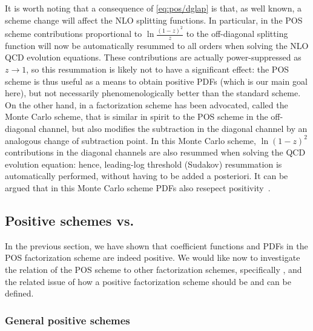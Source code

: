 It is worth noting that a consequence of \cref{eq:pos/dglap} is that,
as well known, a scheme change will affect the NLO splitting
functions. In particular, in the POS scheme contributions proportional
to $\ln\frac{(1-z)^2}{z}$ to the off-diagonal splitting function will
now be automatically resummed to all orders when solving the NLO QCD
evolution equations. These contributions are actually power-suppressed
as $z\to1$, so this resummation is likely not to have a significant
effect: the POS scheme is thus useful as a means to obtain positive
PDFs (which is our main goal here), but not necessarily
phenomenologically better than the standard \msbar{} scheme. On the
other hand, in \cite{Jadach:2016acv} a factorization scheme has
been advocated, called the Monte Carlo scheme, that is similar in
spirit to the POS scheme in the off-diagonal channel, but also
modifies the \msbar{} subtraction in the diagonal channel by an
analogous change of subtraction point. In this Monte Carlo scheme,
$\ln(1-z)^2$ contributions in the diagonal channels are also resummed
when solving the QCD evolution equation: hence, leading-log threshold (Sudakov)
resummation is automatically performed, without having to be added a
posteriori. It can be argued that in this Monte Carlo scheme PDFs also
resepect positivity~\cite{jadprivate}.



\subsection{Positive schemes vs.\ \msbar{}}
\label{sec:gen}

In the previous section, we have shown that coefficient functions and
PDFs in the POS
factorization scheme are indeed positive. We would like now to
investigate the relation of the POS scheme to other factorization
schemes, specifically \msbar{}, and the related issue 
of
how a positive factorization scheme should be and can be defined.

\subsubsection{General positive schemes}
\label{sec:gensch}


